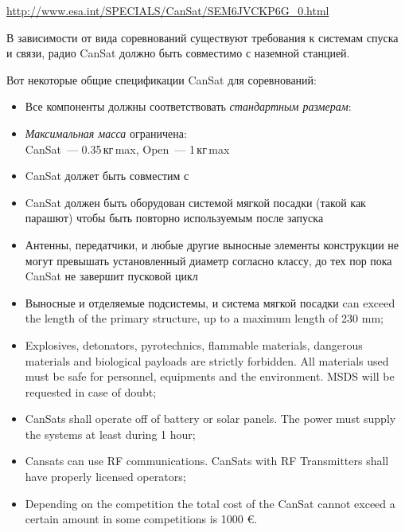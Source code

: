 \label{can}\secdown

\url{http://www.esa.int/SPECIALS/CanSat/SEM6JVCKP6G_0.html}

\noindent
В зависимости от вида соревнований существуют требования к системам спуска и связи, 
радио CanSat должно быть совместимо с наземной станцией.

\bigskip
Вот некоторые общие спецификации CanSat для соревнований:

\begin{itemize}
\item Все компоненты должны соответствовать \emph{стандартным размерам}:
\item \emph{Максимальная масса} ограничена:\\CanSat\ --- 0.35\,кг\,max, Open\ --- 1\,кг\,max
\item CanSat должет быть совместим с 
\item CanSat должен быть оборудован системой мягкой посадки (такой как парашют) чтобы быть повторно используемым после запуска
\item Антенны, передатчики, и любые другие выносные элементы конструкции не могут превышать установленный диаметр согласно классу,
до тех пор пока CanSat не завершит пусковой цикл
\item Выносные и отделяемые подсистемы, и система мягкой посадки  can exceed the length of the primary structure, up to a maximum length of 230 mm;
\item Explosives, detonators, pyrotechnics, flammable materials, dangerous materials and biological payloads are strictly forbidden. All materials used must be safe for personnel, equipments and the environment. MSDS will be requested in case of doubt;
\item CanSats shall operate off of battery or solar panels. The power must supply the systems at least during 1 hour;
\item Cansats can use RF communications. CanSats with RF Transmitters shall have properly licensed operators;
\item Depending on the competition the total cost of the CanSat cannot exceed a certain amount in some competitions is 1000 \euro.
\end{itemize}

\secup
